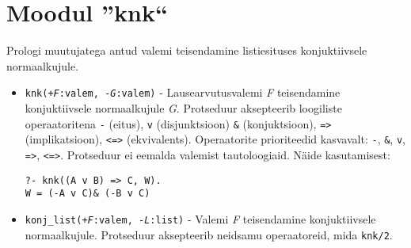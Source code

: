 \section{Moodul ''knk``}

Prologi muutujatega antud valemi teisendamine listiesituses konjuktiivsele normaalkujule.

\begin{itemize}
\item {\tt knk(+{\it F}:valem, -{\it G}:valem)} - Lausearvutusvalemi {\it F} teisendamine konjuktiivsele
normaalkujule {\it G}. Protseduur aksepteerib loogiliste
operaatoritena \texttt{-} (eitus), \texttt{v} (disjunktsioon)
\texttt{\&} (konjuktsioon), \texttt{=>} (implikatsioon),
\texttt{<=>} (ekvivalents). Operaatorite prioriteedid kasvavalt:
\texttt{-}, \texttt{\&}, \texttt{v}, \texttt{=>}, \texttt{<=>}.
Protseduur ei eemalda valemist tautoloogiaid.
Näide kasutamisest:

\begin{verbatim}
?- knk((A v B) => C, W).
W = (-A v C)& (-B v C)
\end{verbatim}


\item {\tt konj\_list(+{\it F}:valem, -{\it L}:list)} - Valemi {\it F} teisendamine konjuktiivsele normaalkujule.
Protseduur aksepteerib neidsamu operaatoreid, mida \texttt{knk/2}.

\end{itemize}


